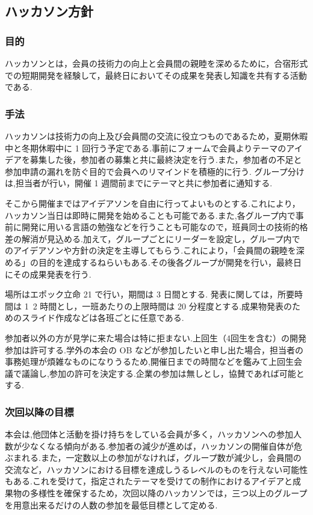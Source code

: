 \documentclass{jsarticle}
\begin{document}
\subsection*{ハッカソン方針}

\subsubsection*{目的}
ハッカソンとは，会員の技術力の向上と会員間の親睦を深めるために，合宿形式での短期開発を経験して，最終日においてその成果を発表し知識を共有する活動である.\\


\subsubsection*{手法}
ハッカソンは技術力の向上及び会員間の交流に役立つものであるため，夏期休暇中と冬期休暇中に 1 回行う予定である.事前にフォームで会員よりテーマのアイデアを募集した後，参加者の募集と共に最終決定を行う.また，参加者の不足と参加申請の漏れを防ぐ目的で会員へのリマインドを積極的に行う.
グループ分けは,担当者が行い，開催 1 週間前までにテーマと共に参加者に通知する.\par
そこから開催まではアイデアソンを自由に行ってよいものとする.これにより，ハッカソン当日は即時に開発を始めることも可能である.また,各グループ内で事前に開発に用いる言語の勉強などを行うことも可能なので，班員同士の技術的格差の解消が見込める.加えて，グループごとにリーダーを設定し，グループ内でのアイデアソンや方針の決定を主導してもらう.これにより，「会員間の親睦を深める」の目的を達成するねらいもある.その後各グループが開発を行い，最終日にその成果発表を行う.\par
場所はエポック立命 21 で行い，期間は 3 日間とする.
発表に関しては，所要時間は 1~2 時間とし，一班あたりの上限時間は 20 分程度とする.成果物発表のためのスライド作成などは各班ごとに任意である.\par
参加者以外の方が見学に来た場合は特に拒まない.上回生（4回生を含む）の開発参加は許可する.学外の本会の OB などが参加したいと申し出た場合，担当者の事務処理が煩雑なものになりうるため,開催日までの時間などを鑑みて上回生会議で議論し,参加の許可を決定する.企業の参加は無しとし，協賛であれば可能とする.\\


\subsubsection*{次回以降の目標}
本会は,他団体と活動を掛け持ちをしている会員が多く，ハッカソンへの参加人数が少なくなる傾向がある.参加者の減少が進めば，ハッカソンの開催自体が危ぶまれる.また，一定数以上の参加がなければ，グループ数が減少し，会員間の交流など，ハッカソンにおける目標を達成しうるレベルのものを行えない可能性もある.これを受けて，指定されたテーマを受けての制作におけるアイデアと成果物の多様性を確保するため，次回以降のハッカソンでは，三つ以上のグループを用意出来るだけの人数の参加を最低目標として定める.\\
\end{document}
